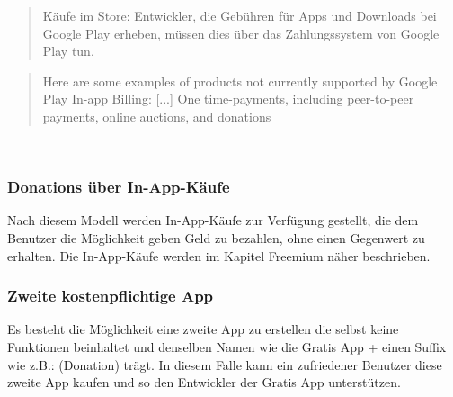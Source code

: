 \documentclass[FIPLY_base.tex]{subfiles}
\begin{document}
\begin{quote}
Käufe im Store: Entwickler, die Gebühren für Apps und Downloads bei Google Play erheben, müssen dies über das Zahlungssystem von Google Play tun.
\end{quote}\cite{gpDevContentPolicy} 

\begin{quote}
Here are some examples of products not currently supported by Google Play In-app Billing: [...]
One time-payments, including peer-to-peer payments, online auctions, and donations
\end{quote}\cite{gpInAppBilling} 

\ \\
\subsubsection{Donations über In-App-Käufe}
Nach diesem Modell werden In-App-Käufe zur Verfügung gestellt, die dem Benutzer die Möglichkeit geben Geld zu bezahlen, ohne einen Gegenwert zu erhalten. 
Die In-App-Käufe werden im Kapitel Freemium näher beschrieben.
\ \\
\subsubsection{Zweite kostenpflichtige App}
Es besteht die Möglichkeit eine zweite App zu erstellen die selbst keine Funktionen beinhaltet und denselben Namen wie die Gratis App + einen Suffix wie z.B.: (Donation) trägt.
In diesem Falle kann ein zufriedener Benutzer diese zweite App kaufen und so den Entwickler der Gratis App unterstützen.
\end{document}
